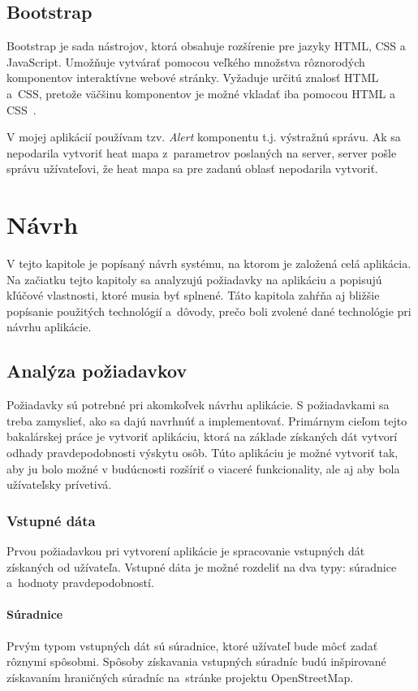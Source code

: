 \section{Bootstrap}
Bootstrap je sada nástrojov, ktorá obsahuje rozšírenie pre jazyky HTML, CSS a JavaScript. Umožňuje vytvárať pomocou veľkého množstva rôznorodých komponentov interaktívne webové stránky. Vyžaduje určitú znalosť HTML a~CSS, pretože väčšinu komponentov je možné vkladať iba pomocou HTML a CSS~\cite{bootstrap}.

V mojej aplikácií používam tzv. \emph{Alert} komponentu t.j. výstražnú správu. Ak sa nepodarila vytvoriť heat mapa z~parametrov poslaných na server, server pošle správu užívateľovi, že heat mapa sa pre zadanú oblasť nepodarila vytvoriť.



\chapter{Návrh}
\label{navrh}
V tejto kapitole je popísaný návrh systému, na ktorom je založená celá aplikácia. Na začiatku tejto kapitoly sa analyzujú požiadavky na aplikáciu a popisujú kľúčové vlastnosti, ktoré musia byť splnené. Táto kapitola zahŕňa aj bližšie popísanie použitých technológií a~dôvody, prečo boli zvolené dané technológie pri návrhu aplikácie.


\section{Analýza požiadavkov}
\label{sec:analysis}
Požiadavky sú potrebné pri akomkoľvek návrhu aplikácie. S požiadavkami sa treba zamyslieť, ako sa dajú navrhnúť a implementovať. Primárnym cieľom tejto bakalárskej práce je vytvoriť aplikáciu, ktorá na základe získaných dát vytvorí odhady pravdepodobnosti výskytu osôb. Túto aplikáciu je možné vytvoriť tak, aby ju bolo možné v budúcnosti rozšíriť o viaceré funkcionality, ale aj aby bola užívateľsky prívetivá.

\subsection{Vstupné dáta}
Prvou požiadavkou pri vytvorení aplikácie je spracovanie vstupných dát získaných od užívateľa.
Vstupné dáta je možné rozdeliť na dva typy: súradnice a~hodnoty pravdepodobností.

\subsubsection{Súradnice}
Prvým typom vstupných dát sú súradnice, ktoré užívateľ bude môcť zadať rôznymi spôsobmi. Spôsoby získavania vstupných súradníc budú inšpirované získavaním hraničných súradníc na~stránke projektu OpenStreetMap.

